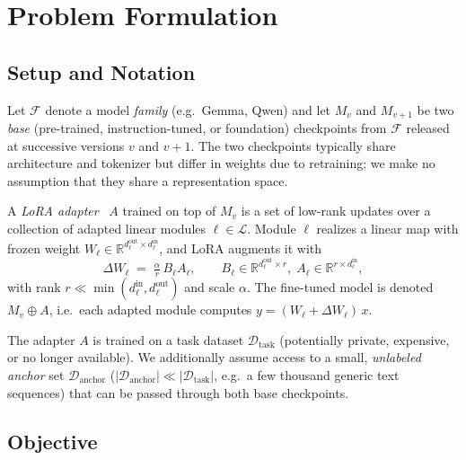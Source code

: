\section{Problem Formulation}
\label{sec:problem}

\subsection{Setup and Notation}

Let $\mathcal{F}$ denote a model \emph{family} (e.g.\ Gemma, Qwen) and let
$M_v$ and $M_{v+1}$ be two \emph{base} (pre-trained, instruction-tuned, or
foundation) checkpoints from $\mathcal{F}$ released at successive versions
$v$ and $v{+}1$. The two checkpoints typically share architecture and
tokenizer but differ in weights due to retraining; we make no assumption
that they share a representation space.

A \emph{LoRA adapter}~\citep{hu2022lora} $A$ trained on top of $M_v$ is a set
of low-rank updates over a collection of adapted linear modules
$\ell \in \mathcal{L}$. Module $\ell$ realizes a linear map with frozen
weight $W_\ell \in \mathbb{R}^{d^{\mathrm{out}}_\ell \times d^{\mathrm{in}}_\ell}$,
and LoRA augments it with
\begin{equation}
  \Delta W_\ell \;=\; \tfrac{\alpha}{r}\, B_\ell A_\ell,
  \qquad
  B_\ell \in \mathbb{R}^{d^{\mathrm{out}}_\ell \times r},\;
  A_\ell \in \mathbb{R}^{r \times d^{\mathrm{in}}_\ell},
\label{eq:lora}
\end{equation}
with rank $r \ll \min(d^{\mathrm{in}}_\ell, d^{\mathrm{out}}_\ell)$ and scale
$\alpha$. The fine-tuned model is denoted $M_v \oplus A$, i.e.\ each adapted
module computes $y = (W_\ell + \Delta W_\ell)\,x$.

The adapter $A$ is trained on a task dataset $\mathcal{D}_{\mathrm{task}}$
(potentially private, expensive, or no longer available). We additionally
assume access to a small, \emph{unlabeled} \emph{anchor} set
$\mathcal{D}_{\mathrm{anchor}}$ ($|\mathcal{D}_{\mathrm{anchor}}| \ll
|\mathcal{D}_{\mathrm{task}}|$, e.g.\ a few thousand generic text sequences)
that can be passed through both base checkpoints.

\subsection{Objective}

